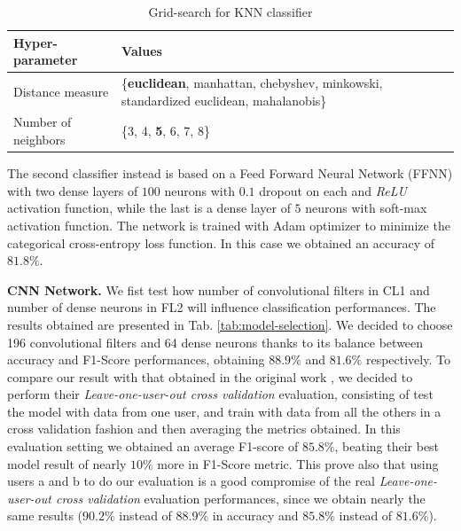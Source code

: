 \begin{table}[h]
	\centering
	\begin{tabular}{p{2.4cm}p{4.5cm}}
		\hline
		Hyper-parameter & Values \\
		\hline
		Distance measure & \{\textbf{euclidean}, manhattan, chebyshev, minkowski, standardized euclidean, mahalanobis\} \\
		Number of neighbors & \{3, 4, \textbf{5}, 6, 7, 8\} \\
		\hline
	\end{tabular}
	\caption{Grid-search for KNN classifier}
	\label{tab:knn-grid-search}
\end{table}

The second classifier
instead is based on a Feed Forward Neural Network (FFNN) with two
dense layers of $100$ neurons with $0.1$ dropout on each and \textit{ReLU}
activation function, while the last is a dense layer of $5$ neurons
with soft-max activation function. The network is trained with Adam
optimizer to minimize the categorical cross-entropy loss function. In this case we obtained an accuracy of $81.8\%$.

\textbf{CNN Network.} We fist test how number of convolutional filters in CL1 and number of dense neurons in FL2 will influence classification performances. The results obtained are presented in Tab. \ref{tab:model-selection}. We decided to choose 196 convolutional filters and 64 dense neurons thanks to its balance between accuracy and F1-Score performances, obtaining $88.9\%$ and $81.6\%$ respectively. To compare our result with that obtained in the original work \cite{stisen2015smart}, we decided to perform their \textit{Leave-one-user-out cross validation} evaluation, consisting of test the model with data from one user, and train with data from all the others in a cross validation fashion and then averaging the metrics obtained. In this evaluation setting we obtained an average F1-score of $85.8\%$, beating their best model result of nearly $10\%$ more in F1-Score metric. This prove also that using users a and b to do our evaluation is a good compromise of the real \textit{Leave-one-user-out cross validation} evaluation performances, since we obtain nearly the same results ($90.2\%$ instead of $88.9\%$ in accuracy and $85.8\%$ instead of $81.6\%$).

